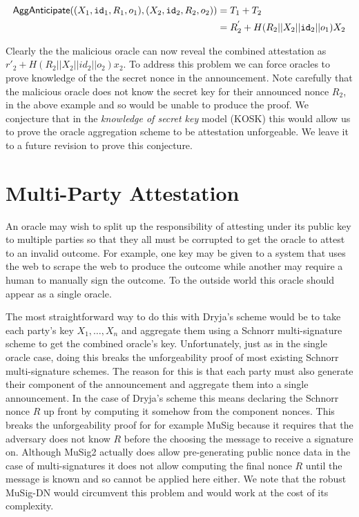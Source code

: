 \documentclass[runningheads]{llncs}
\newcommand{\eventid}{\mathtt{id}}
\newcommand{\Att}{T}
\begin{document}
\begin{align*}
\AggAnticipate((X_{1}, \eventid_{1}, R_{1}, o_{1}), (X_{2}, \eventid_{2}, R_{2}, o_{2})) & =  \Att_{1} + \Att_{2} \\
& = R^{'}_{2} + H(R_{2} || X_{2} || \eventid_2 || o_{1})X_{2}
\end{align*}

Clearly the the malicious oracle can now reveal the combined attestation as $r'_{2} + H(R_{2}||X_{2}||id_{2}|| o_{2})x_{2}$.
To address this problem we can force oracles to prove knowledge of the the secret nonce in the announcement.
Note carefully that the malicious oracle does not know the secret key for their announced nonce $R_{2}$, in the above example and so would be unable to produce the proof.
We conjecture that in the \emph{knowledge of secret key} model (KOSK) \cite{kosk} this would allow us to prove the oracle aggregation scheme to be attestation unforgeable.
We leave it to a future revision to prove this conjecture.

\section{Multi-Party Attestation}
\newcommand{\MultiKeyGen}{\textsf{MultiKeyGen}}
\newcommand{\MultiAnnounce}{\textsf{MultiAnnounce}}
\newcommand{\MultiAttest}{\textsf{MultiAttest}}

An oracle may wish to split up the responsibility of attesting under its public key to multiple parties so that they all must be corrupted to get the oracle to attest to an invalid outcome.
For example, one key may be given to a system that uses the web to scrape the web to produce the outcome while another may require a human to manually sign the outcome.
To the outside world this oracle should appear as a single oracle.

The most straightforward way to do this with Dryja's scheme would be to take each party's key $X_{1},\ldots, X_{n}$ and aggregate them using a Schnorr multi-signature scheme to get the combined oracle's key.
Unfortunately, just as in the single oracle case, doing this breaks the unforgeability proof of most existing Schnorr multi-signature schemes.
The reason for this is that each party must also generate their component of the announcement and aggregate them into a single announcement.
In the case of Dryja's scheme this means declaring the Schnorr nonce $R$ up front by computing it somehow from the component nonces.
This breaks the unforgeability proof for for example MuSig\cite{musig} because it requires that the adversary does not know $R$ before the choosing the message to receive a signature on.
Although MuSig2\cite{musig2} actually does allow pre-generating public nonce data in the case of multi-signatures it does not allow computing the final nonce $R$ until the message is known and so cannot be applied here either.
We note that the robust MuSig-DN\cite{musig-dn} would circumvent this problem and would work at the cost of its complexity.
\end{document}

